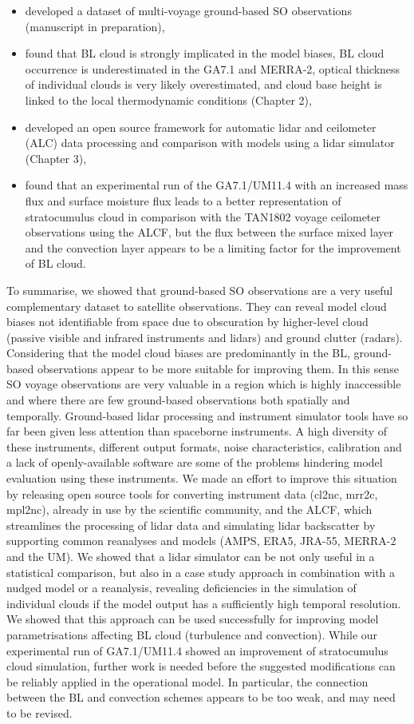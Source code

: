 \begin{itemize}
\item developed a dataset of multi-voyage ground-based SO observations
(manuscript in preparation),
\item found that BL cloud is strongly implicated
in the model biases, BL cloud occurrence is underestimated in the GA7.1 and MERRA-2,
optical thickness of individual clouds is very likely overestimated, and cloud
base height is linked to the local thermodynamic conditions (Chapter 2),
\item developed an open source framework for automatic lidar and ceilometer
(ALC) data processing and comparison with models using a lidar simulator
(Chapter 3),
\item found that an experimental run of the GA7.1/UM11.4 with an increased 
mass flux and surface moisture flux leads to a better representation
of stratocumulus cloud in comparison with the TAN1802 voyage ceilometer
observations using the ALCF, but the flux between the surface mixed layer
and the convection layer appears to be a limiting factor for the improvement
of BL cloud.
\end{itemize}

To summarise, we showed that ground-based SO observations are a very useful
complementary dataset to satellite observations. They can reveal model cloud
biases not identifiable from space due to obscuration by higher-level cloud
(passive visible and infrared instruments and lidars) and ground clutter (radars).
Considering that the model cloud biases are predominantly in the BL, ground-based
observations appear to be more suitable for improving them. In this
sense SO voyage observations are very valuable in a region which is highly
inaccessible and where there are few ground-based observations both spatially
and temporally.
Ground-based
lidar processing and instrument simulator tools have so far been given
less attention than spaceborne instruments. A high diversity of these instruments,
different output formats, noise characteristics, calibration and a lack of openly-available
software are some of the problems hindering model evaluation using these
instruments. We made an effort to improve this situation by releasing
open source tools for converting instrument data (cl2nc, mrr2c, mpl2nc), already
in use by the scientific community, and the ALCF, which streamlines the
processing of lidar data and simulating lidar backscatter by supporting
common reanalyses and models (AMPS, ERA5, JRA-55, MERRA-2 and the UM).
We showed that a lidar simulator can be not only useful in a statistical
comparison, but also in a case study approach in combination with a nudged
model or a reanalysis, revealing deficiencies in the simulation of individual
clouds if the model output has a sufficiently high temporal resolution.
We showed that this approach can be used successfully for improving model 
parametrisations affecting BL cloud (turbulence and convection).
While our experimental run of GA7.1/UM11.4 showed an improvement of
stratocumulus cloud simulation, further work is needed before the suggested
modifications can be reliably applied in the operational model. In particular,
the connection between the BL and convection schemes appears to be too weak,
and may need to be revised.

